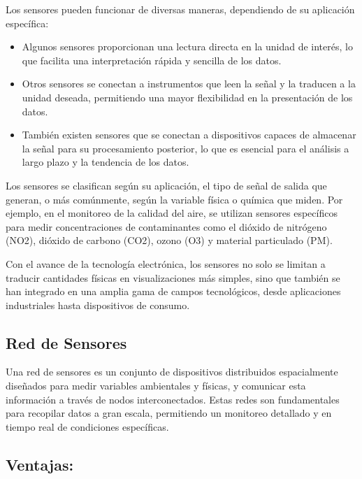 Los sensores pueden funcionar de diversas maneras, dependiendo de su aplicación específica:
\begin{itemize}
\item Algunos sensores proporcionan una lectura directa en la unidad de interés, lo que facilita una interpretación rápida y sencilla de los datos.

\item Otros sensores se conectan a instrumentos que leen la señal y la traducen a la unidad deseada, permitiendo una mayor flexibilidad en la presentación de los datos.

\item También existen sensores que se conectan a dispositivos capaces de almacenar la señal para su procesamiento posterior, lo que es esencial para el análisis a largo plazo y la tendencia de los datos.
\end{itemize}
Los sensores se clasifican según su aplicación, el tipo de señal de salida que generan, o más comúnmente, según la variable física o química que miden. Por ejemplo, en el monitoreo de la calidad del aire, se utilizan sensores específicos para medir concentraciones de contaminantes como el dióxido de nitrógeno (NO2), dióxido de carbono (CO2), ozono (O3) y material particulado (PM).

Con el avance de la tecnología electrónica, los sensores no solo se limitan a traducir cantidades físicas en visualizaciones más simples, sino que también se han integrado en una amplia gama de campos tecnológicos, desde aplicaciones industriales hasta dispositivos de consumo.

\subsection{Red de Sensores}
Una red de sensores es un conjunto de dispositivos distribuidos espacialmente diseñados para medir variables ambientales y físicas, y comunicar esta información a través de nodos interconectados. Estas redes son fundamentales para recopilar datos a gran escala, permitiendo un monitoreo detallado y en tiempo real de condiciones específicas.

\subsection{Ventajas:}

